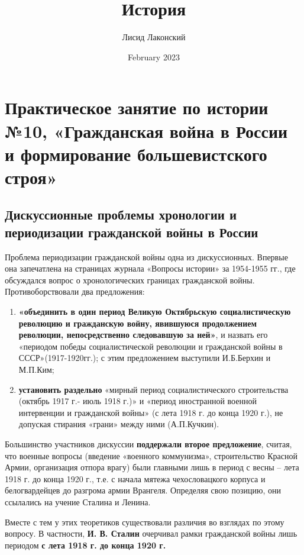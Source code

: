 \documentclass{article}
\title{История}
\author{Лисид Лаконский}
\date{February 2023}
\begin{document}
\raggedright

\maketitle
\tableofcontents
\pagebreak

\section{Практическое занятие по истории №10, «Гражданская война в России и формирование большевистского строя»}

\subsection{Дискуссионные проблемы хронологии и периодизации гражданской войны в России}

 Проблема периодизации гражданской войны одна из дискуссионных. Впервые она запечатлена на страницах журнала «Вопросы истории» за 1954-1955 гг., где обсуждался вопрос о хронологических границах гражданской войны. Противоборствовали два предложения:

\begin{enumerate}
    \item \textbf{«объединить в один период Великую Октябрьскую социалистическую революцию и гражданскую войну, явившуюся продолжением революции, непосредственно следовавшую за ней»}, и назвать его «периодом победы социалистической революции и гражданской войны в СССР»(1917-1920гг.); с этим предложением выступили И.Б.Берхин и М.П.Ким;
    \item \textbf{установить раздельно} «мирный период социалистического строительства (октябрь 1917 г.- июль 1918 г.)» и «период иностранной военной интервенции и гражданской войны» (с лета 1918 г. до конца 1920 г.), не допуская стирания «грани» между ними (А.П.Кучкин).
\end{enumerate}

Большинство участников дискуссии \textbf{поддержали второе предложение}, считая, что военные вопросы (введение «военного коммунизма», строительство Красной Армии, организация отпора врагу) были главными лишь в период с весны – лета 1918 г. до конца 1920 г., т.е. с начала мятежа чехословацкого корпуса и белогвардейцев до разгрома армии Врангеля. Определяя свою позицию, они ссылались на учение Сталина и Ленина.

\hfill

Вместе с тем у этих теоретиков существовали различия во взглядах по этому вопросу. В частности, \textbf{И. В. Сталин} очерчивал рамки гражданской войны лишь периодом \textbf{с лета 1918 г. до конца 1920 г.}
\end{document}
